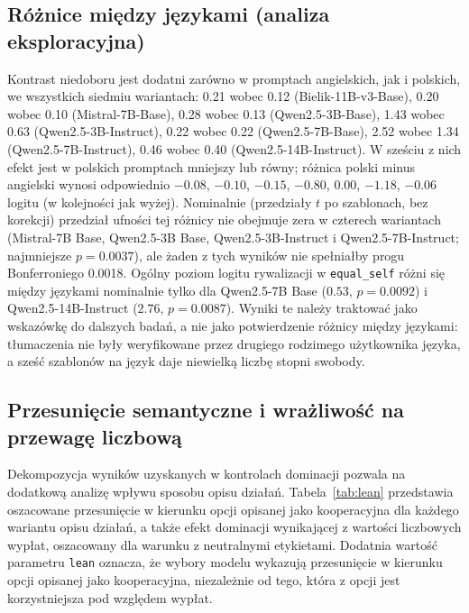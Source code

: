 \documentclass[11pt]{article}
\newcommand{\equalself}{\texttt{equal\_self}}
\begin{document}
\subsection{Różnice między językami (analiza eksploracyjna)}\label{sec:lang}
Kontrast niedoboru jest dodatni zarówno w promptach angielskich, jak i polskich, we wszystkich siedmiu wariantach: 0.21 wobec 0.12 (Bielik-11B-v3-Base), 0.20 wobec 0.10 (Mistral-7B-Base), 0.28 wobec 0.13 (Qwen2.5-3B-Base), 1.43 wobec 0.63 (Qwen2.5-3B-Instruct), 0.22 wobec 0.22 (Qwen2.5-7B-Base), 2.52 wobec 1.34 (Qwen2.5-7B-Instruct), 0.46 wobec 0.40 (Qwen2.5-14B-Instruct). W sześciu z nich efekt jest w polskich promptach mniejszy lub równy; różnica polski minus angielski wynosi odpowiednio $-0.08$, $-0.10$, $-0.15$, $-0.80$, $0.00$, $-1.18$, $-0.06$ logitu (w kolejności jak wyżej). Nominalnie (przedziały $t$ po szablonach, bez korekcji) przedział ufności tej różnicy nie obejmuje zera w czterech wariantach (Mistral-7B Base, Qwen2.5-3B Base, Qwen2.5-3B-Instruct i Qwen2.5-7B-Instruct; najmniejsze $p=0.0037$), ale żaden z tych wyników nie spełniałby progu Bonferroniego 0.0018. Ogólny poziom logitu rywalizacji w \equalself{} różni się między językami nominalnie tylko dla Qwen2.5-7B Base ($0.53$, $p=0.0092$) i Qwen2.5-14B-Instruct ($2.76$, $p=0.0087$). Wyniki te należy traktować jako wskazówkę do dalszych badań, a nie jako potwierdzenie różnicy między językami: tłumaczenia nie były weryfikowane przez drugiego rodzimego użytkownika języka, a sześć szablonów na język daje niewielką liczbę stopni swobody.

\subsection{Przesunięcie semantyczne i wrażliwość na przewagę liczbową}

Dekompozycja wyników uzyskanych w kontrolach dominacji pozwala na dodatkową analizę wpływu sposobu opisu działań. Tabela~\ref{tab:lean} przedstawia oszacowane przesunięcie w kierunku opcji opisanej jako kooperacyjna dla każdego wariantu opisu działań, a także efekt dominacji wynikającej z wartości liczbowych wypłat, oszacowany dla warunku z neutralnymi etykietami. Dodatnia wartość parametru \texttt{lean} oznacza, że wybory modelu wykazują przesunięcie w kierunku opcji opisanej jako kooperacyjna, niezależnie od tego, która z opcji jest korzystniejsza pod względem wypłat.
\end{document}
